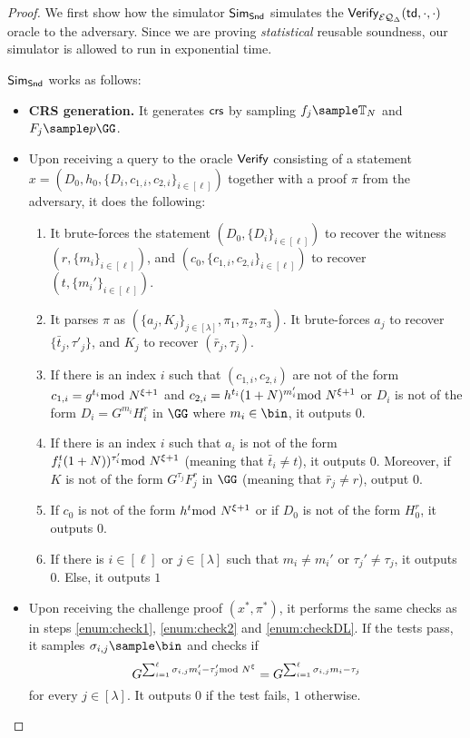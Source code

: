 \begin{proof}
We first show how the simulator $\mathsf{Sim}_\mathsf{Snd}$ simulates the $\mathsf{Verify}_{\mathcal{EQ}_\Delta}(\mathsf{td},\cdot,\cdot)$ oracle to the adversary. Since we are proving \emph{statistical} reusable soundness, our simulator is allowed to run in exponential time.

$\mathsf{Sim}_\mathsf{Snd}$ works as follows:
\begin{itemize}
     \item \textbf{CRS generation.} 
    It generates $\mathsf{crs}$ by sampling $f_{j}\sample \mathbb{T}_N$ and $F_j\sample p\GG$. 
     \item Upon receiving a query to the oracle $\mathsf{Verify}$ consisting of a statement $x=(D_0,h_0,\{D_i,c_{1,i},c_{2,i}\}_{i\in [\ell]})$ together with a proof $\pi$ from the adversary, it does the following:
    \begin{enumerate}
    \item It brute-forces the statement $(D_0,\{D_i\}_{i\in [\ell]})$ to recover the witness $(r,\{m_i\}_{i\in [\ell]})$, and $(c_0,\{c_{1,i},c_{2,i}\}_{i\in [\ell]})$ to recover $(t,\{m_i'\}_{i\in [\ell]})$.
    \item It parses $\pi$ as $(\{a_{j},K_j\}_{j\in [\lambda]},\pi_1,\pi_2,\pi_3)$. It brute-forces $a_{j}$ to recover $\{\bar t_j,\tau'_{j}\}$, and $K_j$ to recover $(\bar r_j,\tau_j)$.
        \item\label{enum:check1} If there is an index $i$ such that $(c_{1,i},c_{2,i})$ are not of the form $c_{1,i}=g^{t_i}\!\!\!\!\mod N^{\xi+1}$ and $c_{2,i}=h^{t_i}(1+N)^{m_i'}\!\!\!\!\mod N^{\xi+1}$ or $D_i$ is not of the form $D_i=G^{m_i}H_i^{r}$ in $\GG$ where $m_i\in\bin$, it outputs $0$.
         \item\label{enum:check2} If there is an index $i$ such that $a_i$ is not of the form $f_i^{t}(1+N))^{\tau_i'}\!\!\!\!\mod N^{\xi+1}$ (meaning that $\bar t_i\neq t$), it outputs $0$. Moreover, if $K$ is not of the form $G^{\tau_j}F_j^r$ in $\GG$ (meaning that $\bar r_j\neq r$), output $0$.
         \item \label{enum:checkDL} If $c_0$ is not of the form $h^{ t}\!\!\!\!\mod N^{\xi+1}$ or if $D_0$ is not of the form $H_0^r$, it outputs $0$.
        \item\label{enum:check3} If there is $i\in [\ell]$ or $j\in [\lambda]$ such that $m_i\neq m_i'$ or $ \tau_{j}'\neq \tau_j$, it outputs $0$. Else, it  outputs $1$
        \end{enumerate}
        \item Upon receiving the challenge proof $(x^*,\pi^*)$, it performs the same checks as in steps \ref{enum:check1}, \ref{enum:check2} and \ref{enum:checkDL}. If the tests pass,  it samples $\sigma_{i,j}\sample \bin$ and checks if $$G^{\sum_{i=1}^\ell \sigma_{i,j} m'_i -\tau_{j}'\!\!\!\!\mod N^{\xi}}=G^{\sum_{i=1}^\ell \sigma_{i,j}m_i-\tau_j}$$ for every $j\in [\lambda]$. It outputs $0$ if the test fails, $1$ otherwise. 
\end{itemize}



\end{proof}
